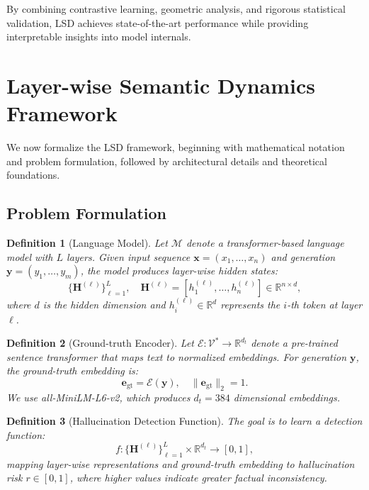 \documentclass[11pt]{article}
\newtheorem{definition}{Definition}
\begin{document}
By combining contrastive learning, geometric analysis, and rigorous statistical validation, LSD achieves state-of-the-art performance while providing interpretable insights into model internals.

\section{Layer-wise Semantic Dynamics Framework}
\label{sec:framework}

We now formalize the LSD framework, beginning with mathematical notation and problem formulation, followed by architectural details and theoretical foundations.

\subsection{Problem Formulation}
\label{sec:formulation}

\begin{definition}[Language Model]
Let $\mathcal{M}$ denote a transformer-based language model with $L$ layers. Given input sequence $\mathbf{x} = (x_1, \ldots, x_n)$ and generation $\mathbf{y} = (y_1, \ldots, y_m)$, the model produces layer-wise hidden states:
\[
\{\mathbf{H}^{(\ell)}\}_{\ell=1}^L, \quad \mathbf{H}^{(\ell)} = [h_1^{(\ell)}, \ldots, h_n^{(\ell)}] \in \mathbb{R}^{n \times d},
\]
where $d$ is the hidden dimension and $h_i^{(\ell)} \in \mathbb{R}^d$ represents the $i$-th token at layer $\ell$.
\end{definition}

\begin{definition}[Ground-truth Encoder]
Let $\mathcal{E}: \mathcal{V}^* \to \mathbb{R}^{d_t}$ denote a pre-trained sentence transformer that maps text to normalized embeddings. For generation $\mathbf{y}$, the ground-truth embedding is:
\[
\mathbf{e}_{\text{gt}} = \mathcal{E}(\mathbf{y}), \quad \|\mathbf{e}_{\text{gt}}\|_2 = 1.
\]
We use all-MiniLM-L6-v2, which produces $d_t = 384$ dimensional embeddings.
\end{definition}

\begin{definition}[Hallucination Detection Function]
The goal is to learn a detection function:
\[
f: \{\mathbf{H}^{(\ell)}\}_{\ell=1}^L \times \mathbb{R}^{d_t} \to [0, 1],
\]
mapping layer-wise representations and ground-truth embedding to hallucination risk $r \in [0, 1]$, where higher values indicate greater factual inconsistency.
\end{definition}
\end{document}
